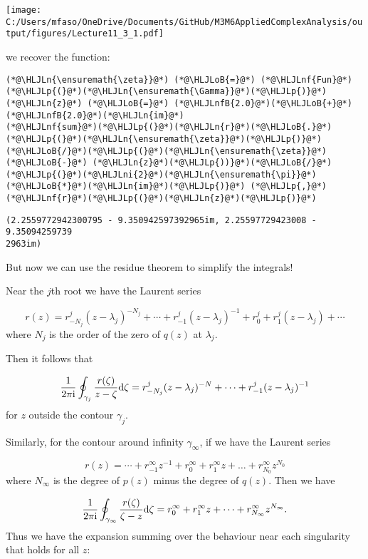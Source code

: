 \documentclass[12pt,a4paper]{article}
\newcommand{\HLJLn}[1]{#1}
\newcommand{\HLJLnf}[1]{\textcolor[RGB]{66,102,213}{#1}}
\newcommand{\HLJLnfB}[1]{\textcolor[RGB]{59,151,46}{#1}}
\newcommand{\HLJLni}[1]{\textcolor[RGB]{59,151,46}{#1}}
\newcommand{\HLJLoB}[1]{\textcolor[RGB]{102,102,102}{\textbf{#1}}}
\newcommand{\HLJLp}[1]{#1}
\def\D{ {\rm d} }
\def\I{ {\rm i} }
\begin{document}
\texttt{[image: C:/Users/mfaso/OneDrive/Documents/GitHub/M3M6AppliedComplexAnalysis/output/figures/Lecture11\_3\_1.pdf]}

we recover the function:


\begin{lstlisting}
(*@\HLJLn{\ensuremath{\zeta}}@*) (*@\HLJLoB{=}@*) (*@\HLJLnf{Fun}@*)(*@\HLJLp{(}@*)(*@\HLJLn{\ensuremath{\Gamma}}@*)(*@\HLJLp{)}@*)
(*@\HLJLn{z}@*) (*@\HLJLoB{=}@*) (*@\HLJLnfB{2.0}@*)(*@\HLJLoB{+}@*)(*@\HLJLnfB{2.0}@*)(*@\HLJLn{im}@*)
(*@\HLJLnf{sum}@*)(*@\HLJLp{(}@*)(*@\HLJLn{r}@*)(*@\HLJLoB{.}@*)(*@\HLJLp{(}@*)(*@\HLJLn{\ensuremath{\zeta}}@*)(*@\HLJLp{)}@*)(*@\HLJLoB{/}@*)(*@\HLJLp{(}@*)(*@\HLJLn{\ensuremath{\zeta}}@*) (*@\HLJLoB{-}@*) (*@\HLJLn{z}@*)(*@\HLJLp{))}@*)(*@\HLJLoB{/}@*)(*@\HLJLp{(}@*)(*@\HLJLni{2}@*)(*@\HLJLn{\ensuremath{\pi}}@*)(*@\HLJLoB{*}@*)(*@\HLJLn{im}@*)(*@\HLJLp{)}@*) (*@\HLJLp{,}@*) (*@\HLJLnf{r}@*)(*@\HLJLp{(}@*)(*@\HLJLn{z}@*)(*@\HLJLp{)}@*)
\end{lstlisting}

\begin{lstlisting}
(2.2559772942300795 - 9.350942597392965im, 2.25597729423008 - 9.35094259739
2963im)
\end{lstlisting}


But now we can use the residue theorem to simplify the integrals!

Near the $j$th root we have the Laurent series

\[
r(z) = r_{-N_j}^j (z-\lambda_j)^{-N_j}  + \cdots + r_{-1}^j (z-\lambda_j)^{-1} + r_0^j + r_1^j (z-\lambda_j) + \cdots
\]
where $N_j$ is the order of the zero of $q(z)$ at $\lambda_j$.

Then it follows that

\[
{1 \over 2 \pi \I} \oint_{\gamma_j} {r(\zeta) \over z - \zeta} \D\zeta =
r_{-N_j}^j (z-\lambda_j)^{-N}  + \cdots + r_{-1}^j (z-\lambda_j)^{-1}
\]
for $z$ outside the contour $\gamma_j$.

Similarly, for the contour around infinity $\gamma_\infty$, if we have the Laurent series

\[
r(z) = \cdots + r_{-1}^\infty z^{-1} + r_0^\infty  + r_1^\infty z + \dots + r_{N_0}^\infty z^{N_0}
\]
where $N_\infty$ is the degree of $p(z)$ minus the degree of $q(z)$. Then we have

\[
{1 \over 2 \pi \I} \oint_{\gamma_\infty} {r(\zeta) \over \zeta - z} \D\zeta =
r_0^\infty + r_1^\infty z + \cdots +  r_{N_{\infty}}^\infty z^{N_{\infty}}.
\]
Thus we have the expansion summing over the behaviour near each singularity that holds for all $z$:
\end{document}
